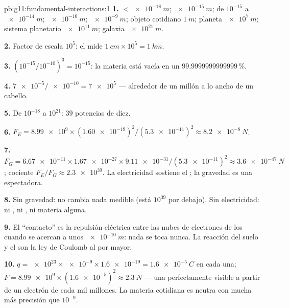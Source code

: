 \begin{solution}{pb:g11:fundamental-interactions:1}
\textbf{1.}  $< \qty{e-18}{m}$;  $\qty{e-15}{m}$;  de
$10^{-15}$ a $\qty{e-14}{m}$;  $\qty{e-10}{m}$; 
$\qty{e-9}{m}$; objeto cotidiano $\qty{1}{m}$; planeta $\qty{e7}{m}$;
sistema planetario $\qty{e11}{m}$; galaxia $\qty{e21}{m}$.

\textbf{2.} Factor de escala $10^{5}$: el  mide
$\qty{1}{cm} \times 10^{5} = \qty{1}{km}$.

\textbf{3.} $(10^{-15}/10^{-10})^3 = 10^{-15}$: la materia está vacía en
un $\num{99.9999999999999}\,\%$.

\textbf{4.} $\num{7e-5}/\num{e-10} = \num{7e5}$  --- alrededor de
un millón a lo ancho de un cabello.

\textbf{5.} De $10^{-18}$ a $10^{21}$: $39$ potencias de diez.

\textbf{6.} $F_E = \num{8.99e9} \times (\num{1.60e-19})^2 /
(\num{5.3e-11})^2 \approx \qty{8.2e-8}{N}$.

\textbf{7.} $F_G = \num{6.67e-11} \times \num{1.67e-27} \times
\num{9.11e-31}/(\num{5.3e-11})^2 \approx \qty{3.6e-47}{N}$; cociente
$F_E/F_G \approx \num{2.3e39}$. La electricidad sostiene el ; la
gravedad es una espectadora.

\textbf{8.} Sin gravedad: no cambia nada medible (está $10^{39}$ por
debajo). Sin electricidad: ni , ni , ni materia alguna.

\textbf{9.} El ``contacto'' es la repulsión eléctrica entre las nubes de
electrones de los  cuando se acercan a unos $\qty{e-10}{m}$: nada
se toca nunca. La reacción del suelo y el  son la ley de
Coulomb al por mayor.

\textbf{10.} $q = \num{e23} \times \num{e-9} \times \num{1.6e-19} =
\qty{1.6e-5}{C}$ en cada una;
$F = \num{8.99e9} \times (\num{1.6e-5})^2 \approx \qty{2.3}{N}$ --- una
 perfectamente visible a partir de un electrón de cada mil
millones. La materia cotidiana es neutra con mucha más precisión que
$10^{-9}$.


\end{solution}
